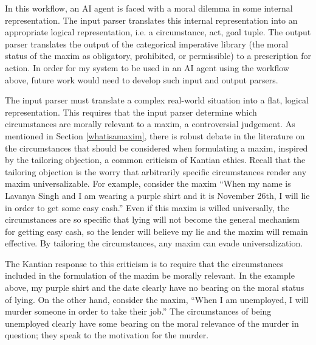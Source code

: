\begin{isabellebody}
\begin{center}
\begin{figure}
\end{figure}
\end{center}
%
\begin{isamarkuptext}%
In this workflow, an AI agent is faced with a moral dilemma in some internal representation. The input
parser translates this internal representation into an appropriate logical representation, i.e. 
a circumstance, act, goal tuple. The output parser translates the output of the categorical imperative
library (the moral status of the maxim as obligatory, prohibited, or permissible) to a prescription for
action. In order for my system to be used in an AI agent using the workflow
above, future work would need to develop such input and output parsers.

The input parser must translate a complex real-world situation into a flat, logical representation.
This requires that the input parser determine which circumstances are morally relevant
to a maxim, a controversial judgement. As mentioned in Section \ref{whatisamaxim},
there is robust debate in the literature on the circumstances that should be considered when formulating a maxim, 
inspired by the tailoring objection, a common criticism of Kantian ethics. Recall that the tailoring objection is the worry that arbitrarily specific 
circumstances render any maxim universalizable. For example, consider the maxim ``When my name is Lavanya Singh 
and I am wearing a purple shirt and it is November 26th, I will lie in order to get some easy cash.'' 
Even if this maxim is willed universally, the circumstances are so 
specific that lying will not become the general mechanism for getting easy cash, so the lender will 
believe my lie and the maxim will remain effective. By tailoring the circumstances, any maxim can 
evade universalization.

The Kantian response to this criticism is to require that the circumstances included in the formulation
of the maxim be morally relevant. In the example above, my purple shirt and the date clearly have no bearing on 
the moral status of lying. On the other hand, consider the maxim, ``When I am unemployed, I will murder
someone in order to take their job.'' The circumstances of being unemployed clearly have some bearing on the moral
relevance of the murder in question; they speak to the motivation for the murder. 


\end{isamarkuptext}
\end{isabellebody}
